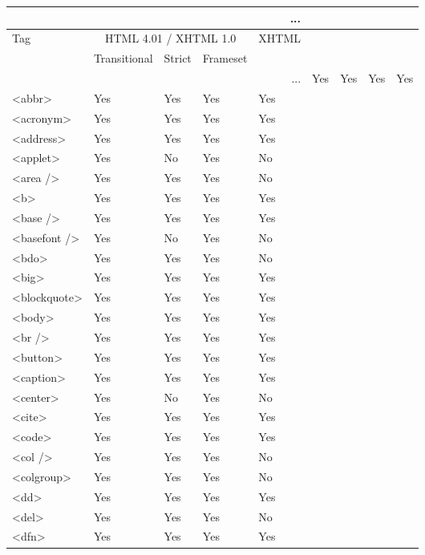 \begin{longtable}{|l|l|l|l|l|}
\multicolumn{5}{r}{...}
\tabularnewline\hline
\endhead
\hline

\multirow{2}{60pt}{Tag}& \multicolumn{3}{c|}{HTML 4.01 / XHTML 1.0}	&\multirow{2}{50pt}{XHTML} \\ \cline{2-4} 
\multicolumn{1}{|c|}{}	&Transitional		& Strict  	&  Frameset	 		& \multicolumn{1}{c|}{}
\tabularnewline\hline
\endfirsthead
\multicolumn{5}{r}{...}
\endfoot
\endlastfoot
<a>					&Yes			&Yes	&Yes				&Yes	\\
\hline
<abbr>				&Yes			&Yes	&Yes				&Yes	\\
\hline
<acronym>			&Yes			&Yes	&Yes				&Yes	\\
\hline
<address>			&Yes			&Yes	&Yes				&Yes	\\
\hline
<applet>				&Yes			&No		&Yes				&No		\\
\hline
<area />				&Yes			&Yes	&Yes				&No		\\
\hline
<b>					&Yes			&Yes	&Yes				&Yes	\\
\hline
<base />				&Yes			&Yes	&Yes				&Yes	\\
\hline
<basefont />			&Yes			&No		&Yes				&No		\\
\hline
<bdo>				&Yes			&Yes	&Yes				&No		\\
\hline
<big>				&Yes			&Yes	&Yes				&Yes	\\
\hline
<blockquote>			&Yes			&Yes	&Yes				&Yes	\\
\hline
<body>				&Yes			&Yes	&Yes				&Yes	\\
\hline
<br />				&Yes			&Yes	&Yes				&Yes	\\
\hline
<button>				&Yes			&Yes	&Yes				&Yes	\\
\hline
<caption>				&Yes			&Yes	&Yes				&Yes	\\
\hline
<center>				&Yes			&No		&Yes				&No		\\
\hline
<cite>				&Yes			&Yes	&Yes				&Yes	\\
\hline
<code>				&Yes			&Yes	&Yes				&Yes	\\
\hline
<col />				&Yes			&Yes	&Yes				&No		\\
\hline
<colgroup>			&Yes			&Yes	&Yes				&No		\\
\hline
<dd>				&Yes			&Yes	&Yes				&Yes	\\
\hline
<del>				&Yes			&Yes	&Yes				&No		\\
\hline
<dfn>				&Yes			&Yes	&Yes				&Yes	\\

\end{longtable}

